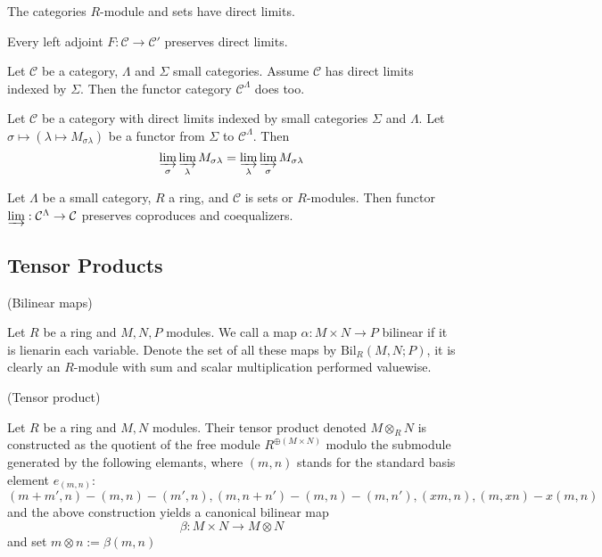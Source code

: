 \documentclass{article}
\begin{document}
    \begin{theorem}
        The categories $R$-module and sets have direct limits.
    \end{theorem}

    \begin{theorem}
        Every left adjoint $F:\mathcal{C}\to \mathcal{C'}$ preserves direct limits.
    \end{theorem}

    \begin{proposition}
        Let $\mathcal{C}$ be a category, $\Lambda$ and $\Sigma$ small categories. Assume $\mathcal{C}$ has direct limits indexed by $\Sigma$. Then the functor category $\mathcal{C}^{\Lambda}$ does too.
    \end{proposition}

    \begin{theorem}
        Let $\mathcal{C}$ be a category with direct limits indexed by small categories $\Sigma$ and $\Lambda$. Let $\sigma\mapsto (\lambda\mapsto M_{\sigma \lambda})$ be a functor from $\Sigma$ to $\mathcal{C}^{\Lambda}$. Then
        \[\varinjlim_{\sigma} \varinjlim_{\lambda} M_{\sigma\lambda} = \varinjlim_{\lambda} \varinjlim_{\sigma}  M_{\sigma\lambda}\]
    \end{theorem}
    \begin{corollary}
        Let $\Lambda$ be a small category, $R$ a ring, and $\mathcal{C}$ is sets or $R$-modules. Then functor $\varinjlim:\mathcal{C}^{\Lambda} \to \mathcal{C}$ preserves coproduces and coequalizers.
    \end{corollary}
\subsection{Tensor Products}

\begin{definition}
    (Bilinear maps)\par
    Let $R$ be a ring and $M,N,P$ modules. We call a map $\alpha: M\times N \to P$ bilinear if it is lienarin each variable. Denote the set of all these maps by $\text{Bil}_R(M,N;P)$, it is clearly an $R$-module with sum and scalar multiplication performed valuewise.
\end{definition}

\begin{definition}
    (Tensor product)\par
    Let $R$ be a ring and $M,N$ modules. Their tensor product denoted $M\otimes_R N$ is constructed as the quotient of the free module $R^{\oplus (M\times N)}$ modulo the submodule generated by the following elemants, where $(m,n)$ stands for the standard basis element $e_{(m,n)}$:
    \[
    (m+m',n)-(m,n)-(m',n), (m,n+n')-(m,n) - (m,n'), (xm,n), (m,xn)-x(m,n)
    \]
    and the above construction yields a canonical bilinear map
    \[
    \beta:M\times N \to M \otimes N
    \]
    and set $m\otimes n:=\beta(m,n)$
\end{definition}
\end{document}
